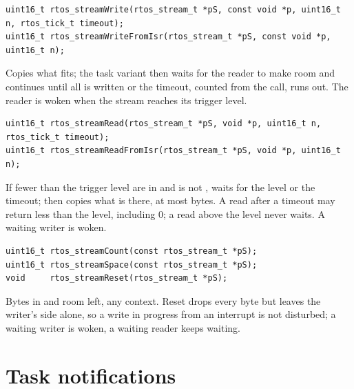 \begin{lstlisting}
uint16_t rtos_streamWrite(rtos_stream_t *pS, const void *p, uint16_t n, rtos_tick_t timeout);
uint16_t rtos_streamWriteFromIsr(rtos_stream_t *pS, const void *p, uint16_t n);
\end{lstlisting}
Copies what fits; the task variant then waits for the reader to make room and continues
until all is written or the timeout, counted from the call, runs out. The reader is woken
when the stream reaches its trigger level.

\begin{lstlisting}
uint16_t rtos_streamRead(rtos_stream_t *pS, void *p, uint16_t n, rtos_tick_t timeout);
uint16_t rtos_streamReadFromIsr(rtos_stream_t *pS, void *p, uint16_t n);
\end{lstlisting}
If fewer than the trigger level are in and  is not ,
waits for the level or the timeout; then copies what is there, at most  bytes. A
read after a timeout may return less than the level, including 0; a read above the level
never waits. A waiting writer is woken.

\begin{lstlisting}
uint16_t rtos_streamCount(const rtos_stream_t *pS);
uint16_t rtos_streamSpace(const rtos_stream_t *pS);
void     rtos_streamReset(rtos_stream_t *pS);
\end{lstlisting}
Bytes in and room left, any context. Reset drops every byte but leaves the writer's side
alone, so a write in progress from an interrupt is not disturbed; a waiting writer is
woken, a waiting reader keeps waiting.

\section{Task notifications}

